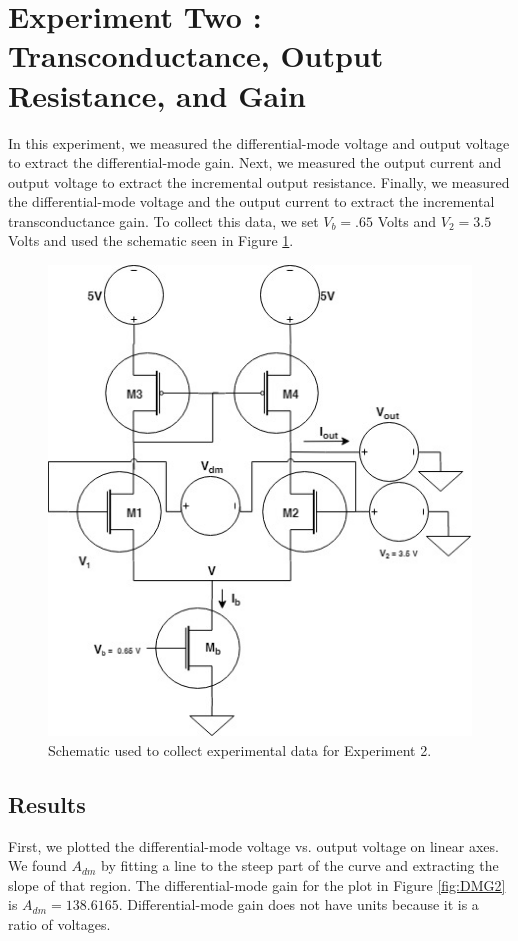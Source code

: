 \documentclass{article}
\begin{document}
\section{Experiment Two : Transconductance, Output Resistance, and Gain}
In this experiment, we measured the differential-mode voltage and output voltage to extract the differential-mode gain.  Next, we measured the output current and output voltage to extract the incremental output resistance.  Finally, we measured the differential-mode voltage and the output current to extract the incremental transconductance gain.  To collect this data, we set $V_{b} = .65$ Volts and $V_{2} = 3.5$ Volts and used the schematic seen in Figure \ref{fig:schm2}.
\begin{figure}[H]
  \begin{center}      
  \includegraphics[scale = 0.5]{images/exp2_schematic.jpg}
  \caption{Schematic used to collect experimental data for Experiment 2.}   
  \label{fig:schm2}
  \end{center}
\end{figure}

\subsection{Results}
 First, we plotted the differential-mode voltage vs. output voltage on linear axes.  We found $A_{dm}$ by fitting a line to the steep part of the curve and extracting the slope of that region.  The differential-mode gain for the plot in Figure \ref{fig:DMG2} is $A_{dm} = 138.6165$.  Differential-mode gain does not have units because it is a ratio of voltages.
\end{document}

